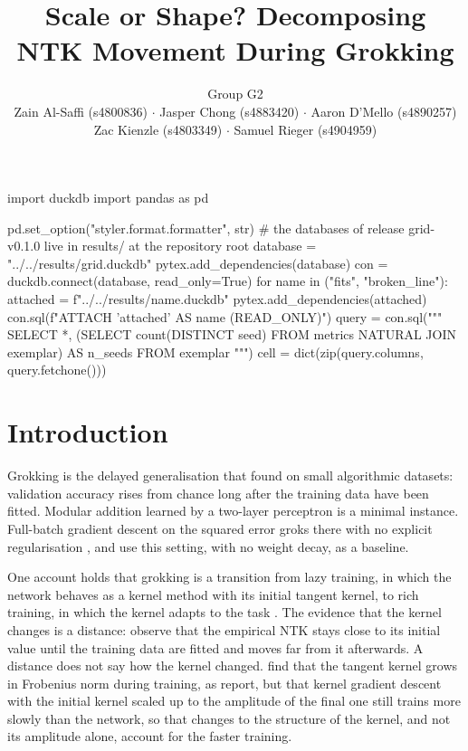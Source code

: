\documentclass[a4paper,11pt]{article} %
\begin{document}
\begin{pycode}
import duckdb
import pandas as pd

pd.set_option("styler.format.formatter", str)
# the databases of release grid-v0.1.0 live in results/ at the repository root
database = "../../results/grid.duckdb"
pytex.add_dependencies(database)
con = duckdb.connect(database, read_only=True)
for name in ("fits", "broken_line"):
    attached = f"../../results/{name}.duckdb"
    pytex.add_dependencies(attached)
    con.sql(f"ATTACH '{attached}' AS {name} (READ_ONLY)")
query = con.sql("""
    SELECT *,
        (SELECT count(DISTINCT seed) FROM metrics NATURAL JOIN exemplar) AS n_seeds
    FROM exemplar
""")
cell = dict(zip(query.columns, query.fetchone()))
\end{pycode}

\title{Scale or Shape? Decomposing NTK Movement During Grokking}
\author{Group G2 \\
  Zain Al-Saffi (s4800836) $\cdot$
  Jasper Chong (s4883420) $\cdot$
  Aaron D'Mello (s4890257) \\
Zac Kienzle (s4803349) $\cdot$ Samuel Rieger (s4904959)}

\date{}
\maketitle

\begin{abstract}
\end{abstract}

\section{Introduction}

Grokking is the delayed generalisation that
\citet{powerGrokkingGeneralizationOverfitting2022} found on small algorithmic
datasets: validation accuracy rises from chance long after the training data
have been fitted. Modular addition learned by a two-layer perceptron is a
minimal instance. Full-batch gradient descent on the squared error groks there
with no explicit regularisation \citep{gromovGrokkingModularArithmetic2023},
and \citet{kumarGrokkingTransitionLazy2024} use this setting, with no weight
decay, as a baseline.

One account holds that grokking is a transition from lazy training, in which
the network behaves as a kernel method with its initial tangent kernel, to rich
training, in which the kernel adapts to the task
\citep{kumarGrokkingTransitionLazy2024}. The evidence that the kernel changes
is a distance: \citet{mohamadiWhyYouGrok2024} observe that the empirical NTK
stays close to its initial value until the training data are fitted and moves
far from it afterwards. A distance does not say how the kernel changed.
\citet{shanTheoryNeuralTangent2022} find that the tangent kernel grows in
Frobenius norm during training, as
\citet{baratinImplicitRegularizationNeural2021} report, but that kernel
gradient descent with the initial kernel scaled up to
the amplitude of the final one still trains more slowly than the network, so
that changes to the structure of the kernel, and not its amplitude alone,
account for the faster training.
\end{document}
